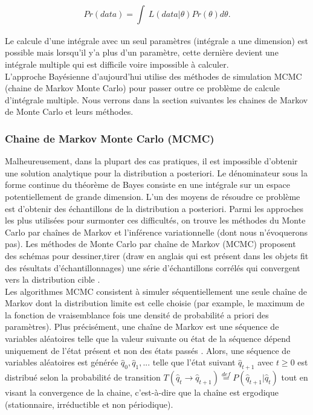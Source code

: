\begin{equation}
	Pr(data) = \int_{}^{}  \,L(data|\theta)Pr(\theta)d\theta .
	\label{probability_of_data}
\end{equation}

Le calcule d’une intégrale avec un seul paramètres (intégrale a une dimension) est possible mais lorsqu’il y’a plus d’un paramètre, cette dernière devient une intégrale multiple qui est difficile voire impossible à calculer. \\
L’approche Bayésienne d’aujourd’hui utilise des méthodes de simulation MCMC (chaine de Markov Monte Carlo) pour passer outre ce problème de calcule d’intégrale multiple. Nous verrons dans la section suivantes les chaines de Markov de Monte Carlo et leurs méthodes.

\subsubsection{Chaine de Markov Monte Carlo (MCMC)}
Malheureusement, dans la plupart des cas pratiques, il est impossible d’obtenir une solution analytique pour la distribution a posteriori. Le dénominateur sous la forme continue du théorème de Bayes consiste en une intégrale sur un espace potentiellement de grande dimension. L’un des moyens de résoudre ce problème est d’obtenir des échantillons de la distribution a posteriori. Parmi les approches les plus utilisées pour surmonter ces difficultés, on trouve les méthodes du Monte Carlo par chaînes de Markov et l’inférence variationnelle (dont nous n’évoquerons pas). Les méthodes de Monte Carlo par chaîne de Markov (MCMC) proposent des schémas pour dessiner,tirer (draw en anglais qui est présent dans les objets fit des résultats d’échantillonnages) une série d'échantillons corrélés qui convergent vers la distribution cible \cite{neal1993probabilistic}. \\

Les algorithmes MCMC consistent à simuler séquentiellement une seule chaîne de Markov dont la distribution limite est celle choisie (par example, le maximum de la fonction de vraisemblance fois une densité de probabilité a priori des paramètres). Plus précisément, une chaîne de Markov est une séquence de variables aléatoires telle que la valeur suivante ou état de la séquence dépend uniquement de l’état présent et non des états passés \cite{neal1993probabilistic}. Alors, une séquence de variables aléatoires est générée \(\displaystyle \widehat{q}_{0}, \widehat{q}_{1}, ... \)  telle que l’état suivant \(\displaystyle \widehat{q}_{t+1} \) avec \(\displaystyle t \geq 0  \) est distribué selon la probabilité de transition \(\displaystyle T(\widehat{q}_{t} \rightarrow \widehat{q}_{t+1}) \overset{def}{=} P(\widehat{q}_{t+1}|\widehat{q}_{t}) \) \cite{gbedo2017techniques} tout en visant la convergence de la chaine, c’est-à-dire que la chaîne est ergodique (stationnaire, irréductible et non périodique). \\

